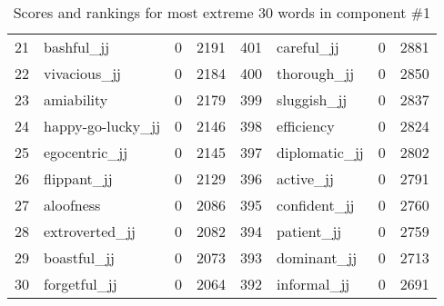 \begin{table}[tbp]
\begin{tabular}{| rlr@{.}l | rlr@{.}l |}
    21 & bashful\_jj & 0 & 2191    &    401 & careful\_jj & 0 & 2881 \\
    22 & vivacious\_jj & 0 & 2184    &    400 & thorough\_jj & 0 & 2850 \\
    23 & amiability & 0 & 2179    &    399 & sluggish\_jj & 0 & 2837 \\
    24 & happy-go-lucky\_jj & 0 & 2146    &    398 & efficiency & 0 & 2824 \\
    25 & egocentric\_jj & 0 & 2145    &    397 & diplomatic\_jj & 0 & 2802 \\
    26 & flippant\_jj & 0 & 2129    &    396 & active\_jj & 0 & 2791 \\
    27 & aloofness & 0 & 2086    &    395 & confident\_jj & 0 & 2760 \\
    28 & extroverted\_jj & 0 & 2082    &    394 & patient\_jj & 0 & 2759 \\
    29 & boastful\_jj & 0 & 2073    &    393 & dominant\_jj & 0 & 2713 \\
    30 & forgetful\_jj & 0 & 2064    &    392 & informal\_jj & 0 & 2691 \\
    \hline
    \end{tabular}
    \caption{Scores and rankings for most extreme 30 words in component \#1} 
\end{table}
\clearpage
